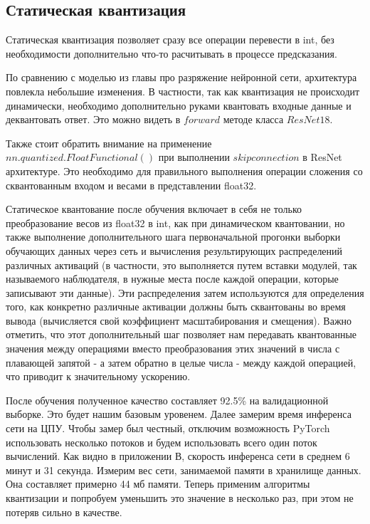 \documentclass[oneside,final,12pt]{extreport}
\begin{document}
\subsection{Статическая квантизация}
Статическая квантизация позволяет сразу все операции перевести в int, без необходимости дополнительно что-то расчитывать в процессе предсказания.

По сравнению с моделью из главы про разряжение нейронной сети, архитектура повлекла небольшие изменения. В частности, так как квантизация не происходит динамически, необходимо дополнительно руками квантовать входные данные и деквантовать ответ. Это можно видеть в $forward$ методе класса $ResNet18$.

Также стоит обратить внимание на применение $nn.quantized.FloatFunctional()$ при выполнении $skip connection$ в ResNet архитектуре. Это необходимо для правильного выполнения операции сложения со сквантованным входом и весами в представлении float32. 

Статическое квантование после обучения включает в себя не только преобразование весов из float32 в int, как при динамическом квантовании, но также выполнение дополнительного шага первоначальной прогонки выборки обучающих данных через сеть и вычисления результирующих распределений различных активаций (в частности, это выполняется путем вставки модулей, так называемого наблюдателя, в нужные места после каждой операции, которые записывают эти данные). Эти распределения затем используются для определения того, как конкретно различные активации должны быть сквантованы во время вывода (вычисляется свой коэффициент масштабирования и смещения). Важно отметить, что этот дополнительный шаг позволяет нам передавать квантованные значения между операциями вместо преобразования этих значений в числа с плавающей запятой - а затем обратно в целые числа - между каждой операцией, что приводит к значительному ускорению.

После обучения полученное качество составляет 92.5\% на валидационной выборке. Это будет нашим базовым уровенем. Далее замерим время инференса сети на ЦПУ. Чтобы замер был честный, отключим возможность PyTorch использовать несколько потоков и будем использовать всего один поток вычислений. Как видно в приложении В, скорость инференса сети в среднем 6 минут и 31 секунда. Измерим вес сети, занимаемой памяти в хранилище данных. Она составляет примерно 44 мб памяти. Теперь применим алгоритмы квантизации и попробуем уменьшить это значение в несколько раз, при этом не потеряв сильно в качестве.
\end{document}
